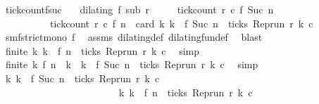 \begin{isabellebody}
\ tick{\isacharunderscore}count{\isacharunderscore}fsuc{\isacharcolon}\isanewline
\ \ \ {\isacartoucheopen}dilating\ f\ sub\ r{\isacartoucheclose}\isanewline
\ \ \ \ \ {\isacartoucheopen}tick{\isacharunderscore}count\ r\ c\ {\isacharparenleft}f\ {\isacharparenleft}Suc\ n{\isacharparenright}{\isacharparenright}\isanewline
\ \ \ \ \ \ \ \ \ {\isacharequal}\ tick{\isacharunderscore}count\ r\ c\ {\isacharparenleft}f\ n{\isacharparenright}\ {\isacharplus}\ card\ {\isacharbraceleft}k{\isachardot}\ k\ {\isacharequal}\ f\ {\isacharparenleft}Suc\ n{\isacharparenright}\ {\isasymand}\ ticks\ {\isacharparenleft}{\isacharparenleft}Rep{\isacharunderscore}run\ r{\isacharparenright}\ k\ c{\isacharparenright}{\isacharbraceright}{\isacartoucheclose}\isanewline
%
\isadelimproof
%
\endisadelimproof
%
\isatagproof
{}\isamarkupfalse%
\ {\isacharminus}\isanewline
\ \ \isamarkupfalse%
\ smf{\isacharcolon}{\isacartoucheopen}strict{\isacharunderscore}mono\ f{\isacartoucheclose}\ \isamarkupfalse%
\ assms\ dilating{\isacharunderscore}def\ dilating{\isacharunderscore}fun{\isacharunderscore}def\ \isamarkupfalse%
\ blast\isanewline
\ \ \isamarkupfalse%
\ \isamarkupfalse%
\ {\isacartoucheopen}finite\ {\isacharbraceleft}k{\isachardot}\ k\ {\isasymle}\ f\ n\ {\isasymand}\ ticks\ {\isacharparenleft}{\isacharparenleft}Rep{\isacharunderscore}run\ r{\isacharparenright}\ k\ c{\isacharparenright}{\isacharbraceright}{\isacartoucheclose}\ \isamarkupfalse%
\ simp\isanewline
\ \ \isamarkupfalse%
\ \isamarkupfalse%
\ {\isacharasterisk}{\isacharcolon}{\isacartoucheopen}finite\ {\isacharbraceleft}k{\isachardot}\ f\ n\ {\isacharless}\ k\ {\isasymand}\ k\ {\isasymle}\ f\ {\isacharparenleft}Suc\ n{\isacharparenright}\ {\isasymand}\ ticks\ {\isacharparenleft}{\isacharparenleft}Rep{\isacharunderscore}run\ r{\isacharparenright}\ k\ c{\isacharparenright}{\isacharbraceright}{\isacartoucheclose}\ \isamarkupfalse%
\ simp\isanewline
\ \ \isamarkupfalse%
\ \isamarkupfalse%
\ {\isacartoucheopen}{\isacharbraceleft}k{\isachardot}\ k\ {\isasymle}\ f\ {\isacharparenleft}Suc\ n{\isacharparenright}\ {\isasymand}\ ticks\ {\isacharparenleft}{\isacharparenleft}Rep{\isacharunderscore}run\ r{\isacharparenright}\ k\ c{\isacharparenright}{\isacharbraceright}\ {\isacharequal}\isanewline
\ \ \ \ \ \ \ \ \ \ \ \ \ \ \ \ \ \ \ \ \ \ \ \ {\isacharbraceleft}k{\isachardot}\ k\ {\isasymle}\ f\ n\ {\isasymand}\ ticks\ {\isacharparenleft}{\isacharparenleft}Rep{\isacharunderscore}run\ r{\isacharparenright}\ k\ c{\isacharparenright}{\isacharbraceright}\isanewline

\end{isabellebody}
